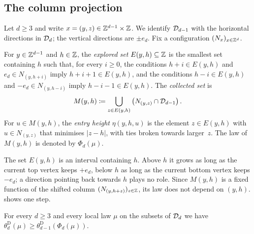 \documentclass[11pt,letterpaper]{article}
\begin{document}
\subsection{The column projection}

Let $d\ge3$ and write $x=(y,z)\in\mathbb Z^{d-1}\times\mathbb Z$. We identify $\mathcal D_{d-1}$ with the horizontal directions in $\mathcal D_d$; the vertical directions are $\pm e_d$. Fix a configuration $(N_x)_{x\in\mathbb Z^d}$.

\begin{definition}\label{def:column}
For $y\in\mathbb Z^{d-1}$ and $h\in\mathbb Z$, the \emph{explored set} $E(y,h)\subseteq\mathbb Z$ is the smallest set containing $h$ such that, for every $i\ge0$, the conditions $h+i\in E(y,h)$ and $e_d\in N_{(y,h+i)}$ imply $h+i+1\in E(y,h)$, and the conditions $h-i\in E(y,h)$ and $-e_d\in N_{(y,h-i)}$ imply $h-i-1\in E(y,h)$. The \emph{collected set} is
\begin{equation*}
M(y,h)\coloneqq\bigcup_{z\in E(y,h)}\big(N_{(y,z)}\cap\mathcal D_{d-1}\big)\,.
\end{equation*}
For $u\in M(y,h)$, the \emph{entry height} $\eta(y,h,u)$ is the element $z\in E(y,h)$ with $u\in N_{(y,z)}$ that minimises $|z-h|$, with ties broken towards larger~$z$. The law of $M(y,h)$ is denoted by $\Phi_d(\mu)$.
\end{definition}

The set $E(y,h)$ is an interval containing $h$. Above $h$ it grows as long as the current top vertex keeps $+e_d$, below $h$ as long as the current bottom vertex keeps $-e_d$; a direction pointing back towards $h$ plays no role. Since $M(y,h)$ is a fixed function of the shifted column $(N_{(y,h+z)})_{z\in\mathbb Z}$, its law does not depend on $(y,h)$.  shows one step.



\begin{proposition}\label{prop:projection}
For every $d\ge3$ and every local law $\mu$ on the subsets of $\mathcal D_d$ we have $\theta^{\mathrm D}_d(\mu)\ge\theta^{\mathrm D}_{d-1}(\Phi_d(\mu))$.
\end{proposition}
\end{document}
